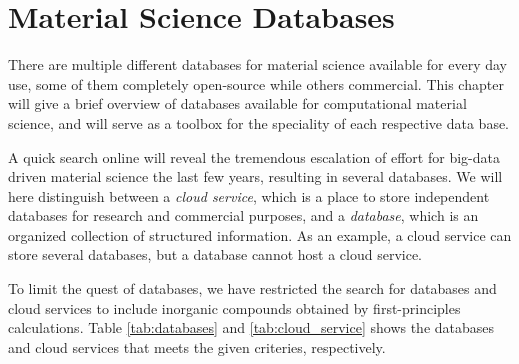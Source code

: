 \chapter{Material Science Databases}
There are multiple different databases for material science available for every day use, some of them completely open-source while others commercial. This chapter will give a brief overview of databases available for computational material science, and will serve as a toolbox for the speciality of each respective data base.

A quick search online will reveal the tremendous escalation of effort for big-data driven material science the last few years, resulting in several databases. We will here distinguish between a \textit{cloud service}, which is a place to store independent databases for research and commercial purposes, and a \textit{database}, which is an organized collection of structured information. As an example, a cloud service can store several databases, but a database cannot host a cloud service.

To limit the quest of databases, we have restricted the search for databases and cloud services to include inorganic compounds obtained by first-principles calculations. Table \ref{tab:databases} and \ref{tab:cloud_service} shows the databases and cloud services that meets the given criteries, respectively.

\clearpage




